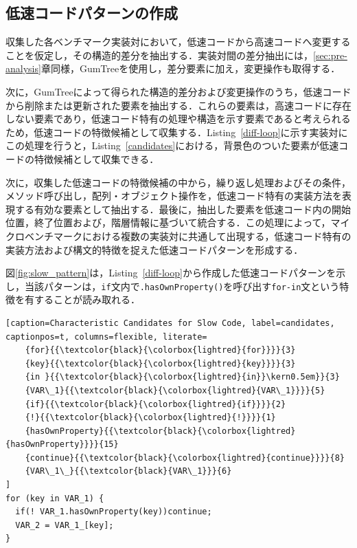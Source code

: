 \documentclass[submit,techrep,noauthor]{ipsj}
\begin{document}
\subsection{低速コードパターンの作成}
収集した各ベンチマーク実装対において，低速コードから高速コードへ変更することを仮定し，その構造的差分を抽出する．実装対間の差分抽出には，\ref{sec:pre-analysis}章同様，GumTreeを使用し，差分要素に加え，変更操作も取得する．

次に，GumTreeによって得られた構造的差分および変更操作のうち，低速コードから削除または更新された要素を抽出する．これらの要素は，高速コードに存在しない要素であり，低速コード特有の処理や構造を示す要素であると考えられるため，低速コードの特徴候補として収集する．Listing~\ref{diff-loop}に示す実装対にこの処理を行うと，Listing~\ref{candidates}における，背景色のついた要素が低速コードの特徴候補として収集できる．

次に，収集した低速コードの特徴候補の中から，繰り返し処理およびその条件，メソッド呼び出し，配列・オブジェクト操作を，低速コード特有の実装方法を表現する有効な要素として抽出する．最後に，抽出した要素を低速コード内の開始位置，終了位置および，階層情報に基づいて統合する．この処理によって，マイクロベンチマークにおける複数の実装対に共通して出現する，低速コード特有の実装方法および構文的特徴を捉えた低速コードパターンを形成する．

図\ref{fig:slow_pattern}は，Listing~\ref{diff-loop}から作成した低速コードパターンを示し，当該パターンは，\texttt{if}文内で\texttt{.hasOwnProperty()}を呼び出す\texttt{for-in}文という特徴を有することが読み取れる．

\begin{lstlisting}[caption=Characteristic Candidates for Slow Code, label=candidates, captionpos=t, columns=flexible, literate=
    {for}{{\textcolor{black}{\colorbox{lightred}{for}}}}{3}
    {key}{{\textcolor{black}{\colorbox{lightred}{key}}}}{3}
    {in }{{\textcolor{black}{\colorbox{lightred}{in}}\kern0.5em}}{3}
    {VAR\_1}{{\textcolor{black}{\colorbox{lightred}{VAR\_1}}}}{5}
    {if}{{\textcolor{black}{\colorbox{lightred}{if}}}}{2}
    {!}{{\textcolor{black}{\colorbox{lightred}{!}}}}{1}
    {hasOwnProperty}{{\textcolor{black}{\colorbox{lightred}{hasOwnProperty}}}}{15}
    {continue}{{\textcolor{black}{\colorbox{lightred}{continue}}}}{8}
    {VAR\_1\_}{{\textcolor{black}{VAR\_1}}}{6}
]
for (key in VAR_1) {
  if(! VAR_1.hasOwnProperty(key))continue;
  VAR_2 = VAR_1_[key];
}
\end{lstlisting}
\end{document}
